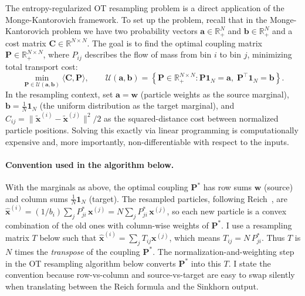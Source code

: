 \documentclass{article}
\begin{document}
The entropy-regularized OT resampling problem is a direct application of the Monge-Kantorovich framework. To set up the problem, recall that in the Monge-Kantorovich problem we have two probability vectors $\mathbf{a} \in \mathbb{R}^N_+$ and $\mathbf{b} \in \mathbb{R}^N_+$ and a cost matrix $\mathbf{C} \in \mathbb{R}^{N\times N}$. The goal is to find the optimal coupling matrix $\mathbf{P} \in \mathbb{R}_+^{N\times N}$, where $P_{ij}$ describes the flow of mass from bin $i$ to bin $j$, minimizing total transport cost:
\begin{equation}
    \min_{\mathbf{P} \in \mathcal{U}(\mathbf{a}, \mathbf{b})} \langle \mathbf{C}, \mathbf{P} \rangle, \qquad
    \mathcal{U}(\mathbf{a}, \mathbf{b}) = \left\{ \mathbf{P} \in \mathbb{R}_+^{N\times N} : \mathbf{P}\mathbf{1}_N = \mathbf{a},\; \mathbf{P}^\top \mathbf{1}_N = \mathbf{b} \right\}.
\end{equation}
In the resampling context, set $\mathbf{a} = \mathbf{w}$ (particle weights as the source marginal), $\mathbf{b} = \frac{1}{N}\mathbf{1}_N$ (the uniform distribution as the target marginal), and $C_{ij} = \|\tilde{\mathbf{x}}^{(i)} - \tilde{\mathbf{x}}^{(j)}\|^2/2$ as the squared-distance cost between normalized particle positions. Solving this exactly via linear programming is computationally expensive and, more importantly, non-differentiable with respect to the inputs.

\paragraph{Convention used in the algorithm below.} With the marginals as above, the optimal coupling $\mathbf{P}^*$ has row sums $\mathbf{w}$ (source) and column sums $\tfrac{1}{N}\mathbf{1}_N$ (target). The resampled particles, following Reich~\cite{reich2013nonparametric}, are $\hat{\mathbf{x}}^{(i)} = (1/b_i)\sum_j P^*_{ji}\,\mathbf{x}^{(j)} = N\sum_j P^*_{ji}\,\mathbf{x}^{(j)}$, so each new particle is a convex combination of the old ones with column-wise weights of $\mathbf{P}^*$. I use a resampling matrix $T$ below such that $\hat{\mathbf{x}}^{(i)} = \sum_j T_{ij}\mathbf{x}^{(j)}$, which means $T_{ij} = N\,P^*_{ji}$. Thus $T$ is $N$ times the \emph{transpose} of the coupling $\mathbf{P}^*$. The normalization-and-weighting step in the OT resampling algorithm below converts $\mathbf{P}^*$ into this $T$. I state the convention because row-vs-column and source-vs-target are easy to swap silently when translating between the Reich formula and the Sinkhorn output.
\end{document}
